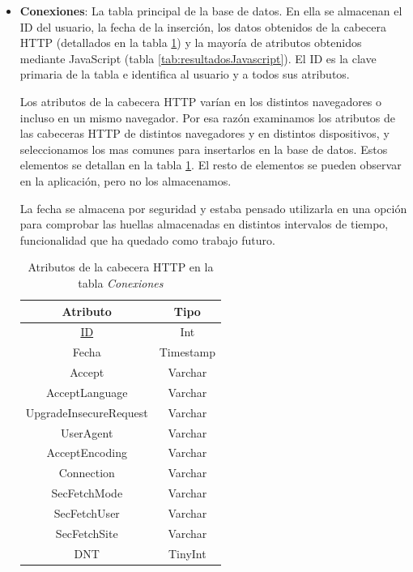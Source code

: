 \begin{itemize}
    \item \textbf{Conexiones}: La tabla principal de la base de datos. En ella se almacenan el ID del usuario, la fecha de la inserción, los datos obtenidos de la cabecera HTTP (detallados en la tabla \ref{tab:resultadosHTTP}) y la mayoría de atributos obtenidos mediante JavaScript (tabla \ref{tab:resultadosJavascript}).
    El ID es la clave primaria de la tabla e identifica al usuario y a todos sus atributos.\par
    Los atributos de la cabecera HTTP varían en los distintos navegadores o incluso en un mismo navegador. Por esa razón examinamos los atributos de las cabeceras HTTP de distintos navegadores y en distintos dispositivos, y seleccionamos los mas comunes para insertarlos en la base de datos. Estos elementos se detallan en la tabla \ref{tab:resultadosHTTP}. El resto de elementos se pueden observar en la aplicación, pero no los almacenamos.\par
    La fecha se almacena por seguridad y estaba pensado utilizarla en una opción para comprobar las huellas almacenadas en distintos intervalos de tiempo, funcionalidad que ha quedado como trabajo futuro. \par
    \begin{table}[tbp]
        \centering
        \begin{tabular}{c|c}
            \textbf{Atributo} & \textbf{Tipo} \\ \hline
            \underline{ID} & Int \\
            Fecha & Timestamp \\
            Accept & Varchar\\
            AcceptLanguage & Varchar\\
            UpgradeInsecureRequest & Varchar\\
            UserAgent & Varchar\\
            AcceptEncoding & Varchar\\
            Connection & Varchar\\
            SecFetchMode & Varchar\\
            SecFetchUser & Varchar\\
            SecFetchSite & Varchar\\
            DNT & TinyInt\\
        \end{tabular}
        \caption{Atributos de la cabecera HTTP en la tabla \textit{Conexiones}}
        \label{tab:resultadosHTTP}

\end{table}
\end{itemize}
